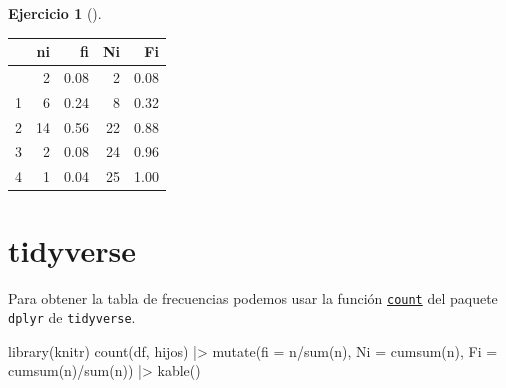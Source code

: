 \documentclass[
  spanish,
  a4paper,
]{scrreport}
\newenvironment{Shaded}{\begin{snugshade}}{\end{snugshade}}
\newcommand{\AttributeTok}[1]{\textcolor[rgb]{0.40,0.45,0.13}{#1}}
\newcommand{\CommentTok}[1]{\textcolor[rgb]{0.37,0.37,0.37}{#1}}
\newcommand{\FunctionTok}[1]{\textcolor[rgb]{0.28,0.35,0.67}{#1}}
\newcommand{\NormalTok}[1]{\textcolor[rgb]{0.00,0.23,0.31}{#1}}
\newcommand{\OtherTok}[1]{\textcolor[rgb]{0.00,0.23,0.31}{#1}}
\newcommand{\SpecialCharTok}[1]{\textcolor[rgb]{0.37,0.37,0.37}{#1}}
\theoremstyle{definition}
\newtheorem{exercise}{Ejercicio}[chapter]
\theoremstyle{remark}
\begin{document}
\begin{exercise}[]
\begin{enumerate}
\begin{tcolorbox}
\begin{Shaded}
\end{Shaded}

  \begin{longtable}[]{@{}lrrrr@{}}
  \toprule\noalign{}
  & ni & fi & Ni & Fi \\
  \midrule\noalign{}
  \endhead
  \bottomrule\noalign{}
  \endlastfoot
  0 & 2 & 0.08 & 2 & 0.08 \\
  1 & 6 & 0.24 & 8 & 0.32 \\
  2 & 14 & 0.56 & 22 & 0.88 \\
  3 & 2 & 0.08 & 24 & 0.96 \\
  4 & 1 & 0.04 & 25 & 1.00 \\
  \end{longtable}

  \section{tidyverse}

  Para obtener la tabla de frecuencias podemos usar la función
  \href{https://aprendeconalf.es/manual-r/06-preprocesamiento.html\#conteo-del-n\%C3\%BAmero-de-observaciones}{\texttt{count}}
  del paquete \texttt{dplyr} de \texttt{tidyverse}.

\begin{Shaded}
\begin{Highlighting}[]
\FunctionTok{library}\NormalTok{(knitr)}
\FunctionTok{count}\NormalTok{(df, hijos) }\SpecialCharTok{|\textgreater{}} 
    \FunctionTok{mutate}\NormalTok{(}\AttributeTok{fi =}\NormalTok{ n}\SpecialCharTok{/}\FunctionTok{sum}\NormalTok{(n), }\AttributeTok{Ni =} \FunctionTok{cumsum}\NormalTok{(n), }\AttributeTok{Fi =} \FunctionTok{cumsum}\NormalTok{(n)}\SpecialCharTok{/}\FunctionTok{sum}\NormalTok{(n)) }\SpecialCharTok{|\textgreater{}}
    \FunctionTok{kable}\NormalTok{()}
\end{Highlighting}
\end{Shaded}


\end{tcolorbox}
\end{enumerate}
\end{exercise}
\end{document}
